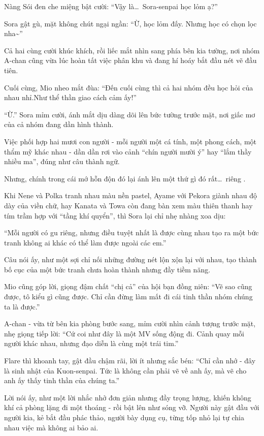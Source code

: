 \documentclass[../main.tex]{subfiles}
\begin{document}
Nàng Sói đen che miệng bật cười: ``Vậy là\dots\ Sora-senpai học lỏm ạ?''

Sora gật gù, mặt không chút ngại ngần: ``Ừ, học lỏm đấy. Nhưng học có chọn lọc nha\~{}''

Cả hai cùng cười khúc khích, rồi liếc mắt nhìn sang phía bên kia tường, nơi nhóm A-chan cũng vừa lúc hoàn tất việc phân khu và đang hí hoáy bắt đầu nét vẽ đầu tiên.

Cuối cùng, Mio nheo mắt đùa: ``Đến cuối cùng thì cả hai nhóm đều học hỏi của nhau nhỉ.Như thể thần giao cách cảm ấy!''

``Ừ.'' Sora mỉm cười, ánh mắt dịu dàng dõi lên bức tường trước mặt, nơi giấc mơ của cả nhóm đang dần hình thành.

Việc phối hợp hai mươi con người - mỗi người một cá tính, một phong cách, một thẩm mỹ khác nhau - dần dần rơi vào cảnh ``chín người mười ý'' hay ``lắm thầy nhiều ma'', đúng như câu thành ngữ.

Nhưng, chính trong cái mớ hỗn độn đó lại ánh lên một thứ gì đó rất\dots\ riêng \hll.

Khi Nene và Polka tranh nhau màu nền pastel, Ayame với Pekora giành nhau độ dày của viền chữ, hay Kanata và Towa còn đang bàn xem màu thiên thanh hay tím trầm hợp với ``tầng khí quyển'', thì Sora lại chỉ nhẹ nhàng xoa dịu:

``Mỗi người có gu riêng, nhưng điều tuyệt nhất là được cùng nhau tạo ra một bức tranh không ai khác có thể làm được ngoài các em.''

Câu nói ấy, như một sợi chỉ nối những đường nét lộn xộn lại với nhau, tạo thành bố cục của một bức tranh chưa hoàn thành nhưng đầy tiềm năng.

Mio cũng góp lời, giọng đậm chất ``chị cả'' của hội bạn đồng niên: ``Vẽ sao cũng được, tô kiểu gì cũng được. Chỉ cần đừng làm mất đi cái tinh thần nhóm chúng ta là được.''

A-chan - vừa từ bên kia phòng bước sang, mỉm cười nhìn cảnh tượng trước mặt, nhẹ giọng tiếp lời: ``Cứ coi như đây là một MV sống động đi. Cảnh quay mỗi người khác nhau, nhưng đạo diễn là cùng một trái tim.''

Flare thì khoanh tay, gật đầu chậm rãi, lời ít nhưng sắc bén: ``Chỉ cần nhớ - đây là sinh nhật của Kuon-senpai. Tức là không cần phải vẽ về anh ấy, mà vẽ cho anh ấy thấy tinh thần của chúng ta.''

Lời nói ấy, như một lời nhắc nhở đơn giản nhưng đầy trọng lượng, khiến không khí cả phòng lặng đi một thoáng - rồi bật lên như sóng vỡ. Người này gật đầu với người kia, kẻ bắt đầu phác thảo, người bày dụng cụ, từng tốp nhỏ lại tự chia nhau việc mà không ai bảo ai.
\end{document}
